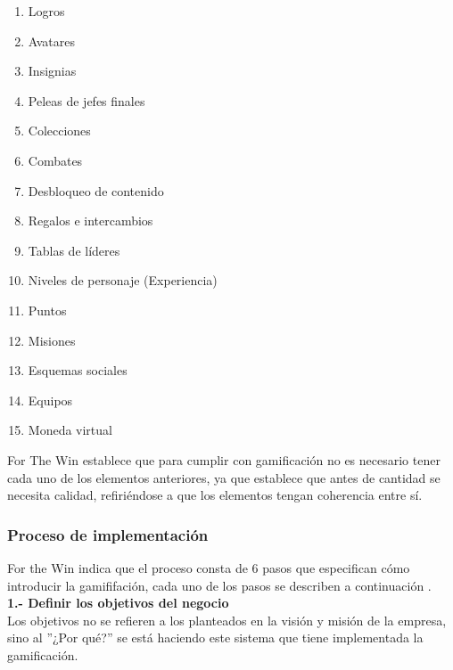     \begin{multicols}{2}
        \begin{enumerate}
            \item Logros
            \item Avatares
            \item Insignias
            \item Peleas de jefes finales
            \item Colecciones
            \item Combates
            \item Desbloqueo de contenido
            \item Regalos e intercambios
            \item Tablas de líderes
            \item Niveles de personaje (Experiencia)
            \item Puntos
            \item Misiones
            \item Esquemas sociales
            \item Equipos
            \item Moneda virtual
        \end{enumerate}
    \end{multicols}
    
    
    \noindent  For The Win establece que para cumplir con gamificación no es necesario tener cada uno de los elementos anteriores, ya que establece que antes de cantidad se necesita calidad, refiriéndose a que los elementos tengan coherencia entre sí.
    
    \subsubsection{ Proceso de implementación}
    
    For the Win indica que el proceso consta de 6 pasos que especifican cómo introducir la gamififación, cada uno de los pasos se describen a continuación \cite[pp. 60-70]{FrameWorkForTheWin}.\\
    
    \noindent \textbf{1.- Definir los objetivos del negocio}\\
    
    \noindent Los objetivos no se refieren a los planteados en la visión y misión de la empresa, sino al ''¿Por qué?'' se está haciendo este sistema que tiene implementada la gamificación.\\
    
